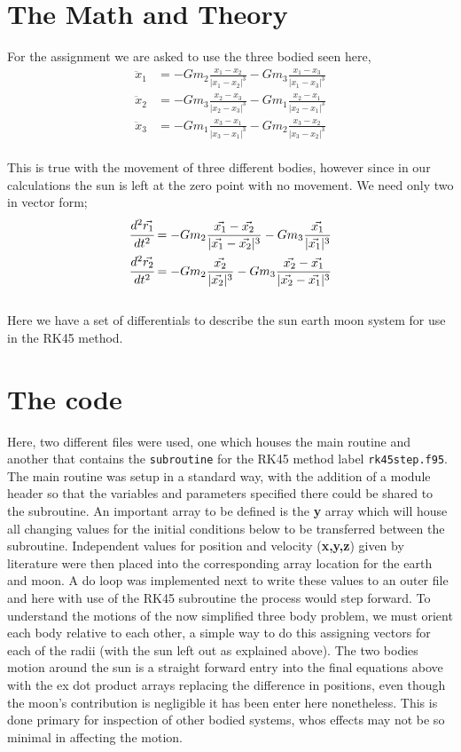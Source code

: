 \documentclass[12pt,letterpaper,notitlepage]{article}
\begin{document}
\section{The Math and Theory}

For the assignment we are asked to use the three bodied   seen here,
\\
	\begin{align}
\ddot{x}_1 &= -G m_2 \frac{x_1 - x_2}{|x_1 - x_2|^3} - G m_3 \frac{x_1 - x_3}{|x_1 - x_3|^3} \\
\ddot{x}_2 &= -G m_3 \frac{x_2 - x_3}{|x_2 - x_3|^3} - G m_1 \frac{x_2 - x_1}{|x_2 - x_1|^3} \\
\ddot{x}_3 &= -G m_1 \frac{x_3 - x_1}{|x_3 - x_1|^3} - G m_2 \frac{x_3 - x_2}{|x_3 - x_2|^3}
	\end{align}
\\
This is true with the movement of three different bodies, however since in our calculations the sun is left at the zero point with no movement. We need only two in vector form;
	\begin{align}
		\cfrac{d^2\vec{r_1}}{dt^2} &= -G m_2 \frac{\vec{x_1} - \vec{x_2}}{|\vec{x_1} - \vec{x_2}|^3} - G m_3 \frac{\vec{x_1}}{|\vec{x_1}|^3} \\
		\cfrac{d^2\vec{r_2}}{dt^2} &= -G m_2 \frac{\vec{x_2}}{|\vec{x_2}|^3} - G m_3 \frac{\vec{x_2} - \vec{x_1}}{|\vec{x_2} - \vec{x_1}|^3}
  	\end{align}
\\
Here we have a set of differentials to describe the sun earth moon system for use in the RK45 method.  

\section{The code}
Here, two different files were used, one which houses the main routine and another that contains the {\tt subroutine} for the RK45 method label {\tt rk45step.f95}. The main routine was setup in a standard way, with the addition of a module header so that the variables and parameters specified there could be shared to the subroutine. An important array to be defined is the \textbf{y} array which will house all changing values for the initial conditions below to be transferred between the subroutine. Independent values for position and velocity (\textbf{x,y,z}) given by literature were then placed into the corresponding array location for the earth and moon. A do loop was implemented next to write these values to an outer file and here with use of the RK45 subroutine the process would step forward.
To understand the motions of the now simplified three body problem, we must orient each body relative to each other, a simple way to do this assigning vectors for each of the radii (with the sun left out as explained above). The two bodies motion around the sun is a straight forward entry into the final equations above with the ex dot product arrays replacing the difference in positions, even though the moon's contribution is negligible it has been enter here nonetheless. This is done primary for inspection of other bodied systems, whos effects may not be so minimal in affecting the motion.      
\end{document}
